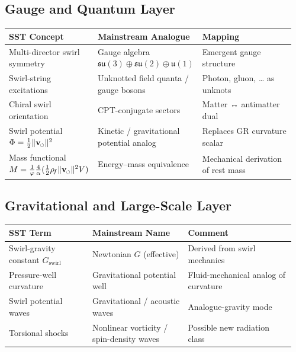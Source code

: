 \documentclass[11pt]{article}
\newcommand{\swirlarrow}{%
	\mathchoice{\mkern-2mu\scriptstyle\boldsymbol{\circlearrowleft}}%
	{\mkern-2mu\scriptstyle\boldsymbol{\circlearrowleft}}%
	{\mkern-2mu\scriptscriptstyle\boldsymbol{\circlearrowleft}}%
	{\mkern-2mu\scriptscriptstyle\boldsymbol{\circlearrowleft}}%
}
\newcommand{\vswirl}{\mathbf{v}_{\swirlarrow}}
\newcommand{\rhoF}{\rho_{\!f}}                           %
\begin{document}
        \subsection*{Gauge and Quantum Layer}

            \begin{tabular}{p{0.28\linewidth} p{0.32\linewidth} p{0.36\linewidth}}
                \textbf{SST Concept} & \textbf{Mainstream Analogue} & \textbf{Mapping}\\
                \hline
                Multi-director swirl symmetry & Gauge algebra \(\mathfrak{su}(3)\!\oplus\!\mathfrak{su}(2)\!\oplus\!\mathfrak{u}(1)\) & Emergent gauge structure\\
                Swirl-string excitations & Unknotted field quanta / gauge bosons & Photon, gluon, … as unknots\\
                Chiral swirl orientation & CPT-conjugate sectors & Matter ↔ antimatter dual\\
                Swirl potential \(\Phi=\tfrac{1}{2}\lVert\vswirl\rVert^2\) & Kinetic / gravitational potential analog & Replaces GR curvature scalar\\
                Mass functional \(M=\frac{1}{\varphi}\frac{4}{\alpha}(\tfrac{1}{2}\rhoF\lVert\vswirl\rVert^2V)\) &
                Energy–mass equivalence & Mechanical derivation of rest mass\\
            \end{tabular}

        \subsection*{Gravitational and Large-Scale Layer}

            \begin{tabular}{p{0.28\linewidth} p{0.32\linewidth} p{0.36\linewidth}}
                \textbf{SST Term} & \textbf{Mainstream Name} & \textbf{Comment}\\
                \hline
                Swirl-gravity constant \(G_{\text{swirl}}\) & Newtonian \(G\) (effective) & Derived from swirl mechanics\\
                Pressure-well curvature & Gravitational potential well & Fluid-mechanical analog of curvature\\
                Swirl potential waves & Gravitational / acoustic waves & Analogue-gravity mode\\
                Torsional shocks & Nonlinear vorticity / spin-density waves & Possible new radiation class\\
            \end{tabular}
\end{document}
